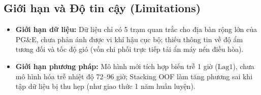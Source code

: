 \subsection{Giới hạn và Độ tin cậy (Limitations)}
\begin{itemize}
    \item \textbf{Giới hạn dữ liệu:} Dữ liệu chỉ có 5 trạm quan trắc cho địa bàn rộng lớn của PG\&E, chưa phản ánh được vi khí hậu cục bộ; thiếu thông tin về độ ẩm tương đối và tốc độ gió (vốn chi phối trực tiếp tải ẩn máy nén điều hòa).
    \item \textbf{Giới hạn phương pháp:} Mô hình mới tích hợp biến trễ 1 giờ ($\text{Lag1}$), chưa mô hình hóa trễ nhiệt độ 72--96 giờ; Stacking OOF làm tăng phương sai khi tập dữ liệu bị thu hẹp (như giao thức 1 năm huấn luyện).
\end{itemize}
